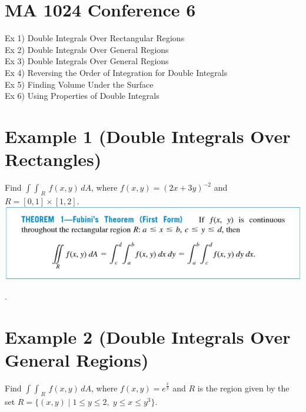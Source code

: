 \documentclass[11pt]{article}
\begin{document}
\section*{MA 1024 Conference 6}

\vspace{\baselineskip}
\vspace{\baselineskip}

Ex 1) Double Integrals Over Rectangular Regions\\

Ex 2) Double Integrals Over General Regions \\

Ex 3) Double Integrals Over General Regions \\

Ex 4) Reversing the Order of Integration for Double Integrals\\

Ex 5) Finding Volume Under the Surface\\

Ex 6) Using Properties of Double Integrals\\

\newpage


\section*{Example 1 (Double Integrals Over Rectangles)}

Find $\int \int_{\; R} \, f(x,y) \, dA$, where $f(x,y) = (2x+3y)^{-2}$ and $R = [0,1] \times [1,2]$. \\

\includegraphics{Capture1.jpg}



\newpage

.

\newpage

\section*{Example 2 (Double Integrals Over General Regions)}

Find $\int \int_{\; R} \, f(x,y) \, dA$, where $f(x,y) = e^{\frac{x}{y}}$ and $R$ is the region given by the set $R = \{(x,y) \; | \; 1\leq y \leq 2, \; y\leq x \leq y^3\}$. \\
\end{document}

